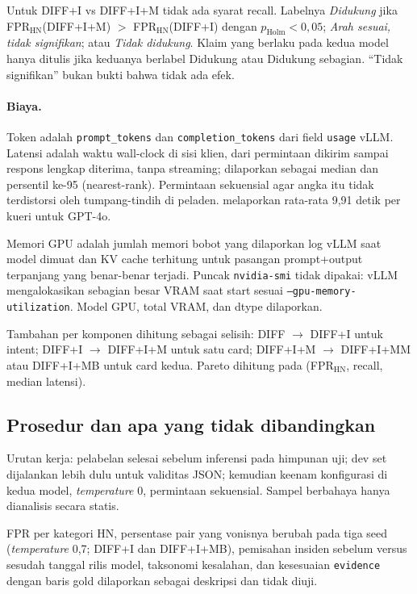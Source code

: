 \documentclass[a4paper,fleqn]{cas-dc}
\begin{document}
Untuk DIFF+I vs DIFF+I+M tidak ada syarat recall. Labelnya \emph{Didukung}
jika FPR$_{\mathrm{HN}}$(DIFF+I+M) $>$ FPR$_{\mathrm{HN}}$(DIFF+I) dengan
$p_{\mathrm{Holm}}{<}0{,}05$; \emph{Arah sesuai, tidak signifikan}; atau
\emph{Tidak didukung}. Klaim yang berlaku pada kedua model hanya ditulis jika
keduanya berlabel Didukung atau Didukung sebagian. ``Tidak signifikan'' bukan
bukti bahwa tidak ada efek.

\paragraph{Biaya.}
Token adalah \texttt{prompt\_tokens} dan \texttt{completion\_tokens} dari
field \texttt{usage} vLLM. Latensi adalah waktu wall-clock di sisi klien,
dari permintaan dikirim sampai respons lengkap diterima, tanpa streaming;
dilaporkan sebagai median dan persentil ke-95 (nearest-rank). Permintaan
sekuensial agar angka itu tidak terdistorsi oleh tumpang-tindih di peladen.
\citet{wyss2025evaluating} melaporkan rata-rata 9,91 detik per kueri untuk
GPT-4o.

Memori GPU adalah jumlah memori bobot yang dilaporkan log vLLM saat model
dimuat dan KV cache terhitung untuk pasangan prompt+output terpanjang yang
benar-benar terjadi. Puncak \texttt{nvidia-smi} tidak dipakai: vLLM
mengalokasikan sebagian besar VRAM saat start sesuai
\texttt{--gpu-memory-utilization}. Model GPU, total VRAM, dan dtype
dilaporkan.

Tambahan per komponen dihitung sebagai selisih: DIFF $\rightarrow$ DIFF+I
untuk intent; DIFF+I $\rightarrow$ DIFF+I+M untuk satu card; DIFF+I+M
$\rightarrow$ DIFF+I+MM atau DIFF+I+MB untuk card kedua. Pareto dihitung pada
(FPR$_{\mathrm{HN}}$, recall, median latensi).

\subsection{Prosedur dan apa yang tidak dibandingkan}

Urutan kerja: pelabelan selesai sebelum inferensi pada himpunan uji; dev set
dijalankan lebih dulu untuk validitas JSON; kemudian keenam konfigurasi di
kedua model, \emph{temperature} 0, permintaan sekuensial. Sampel berbahaya
hanya dianalisis secara statis.

FPR per kategori HN, persentase pair yang vonisnya berubah pada tiga seed
(\emph{temperature} 0,7; DIFF+I dan DIFF+I+MB), pemisahan insiden sebelum versus sesudah
tanggal rilis model, taksonomi kesalahan, dan kesesuaian \texttt{evidence}
dengan baris gold dilaporkan sebagai deskripsi dan tidak diuji.
\end{document}
